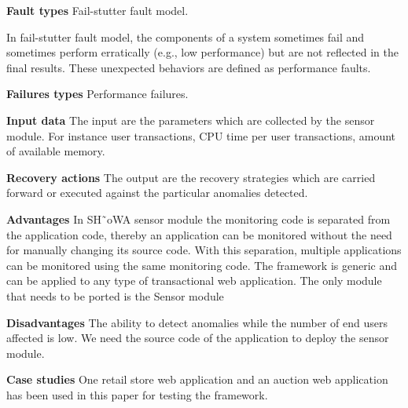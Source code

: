 \begin{compactitem}
\item[\textbf{Fault types}]Fail-stutter fault model. 

In fail-stutter fault model, the components of a system sometimes fail and sometimes perform erratically (e.g., low performance) but are not reflected in the final results. These unexpected behaviors are defined as performance faults.

\item[\textbf{Failures types}]Performance failures.

\item[\textbf{Input data}] The input are the parameters which are collected by the sensor module. For instance user transactions, CPU time per user transactions, amount of available memory.

\item[\textbf{Recovery actions}]The output are the recovery strategies which are carried forward or executed against the particular anomalies detected.

\item[\textbf{Advantages}] In SH˜oWA sensor module the monitoring code is separated from the application code, thereby an application can be monitored without the need for manually changing its source code. With this separation, multiple applications can be monitored using the same monitoring code. The framework is generic and can be applied to any type of transactional web application. The only module that needs to be ported is the Sensor module

\item[\textbf{Disadvantages}]The ability to detect anomalies while the number of end users affected is low.
We need the source code of the application to deploy the sensor module.

\item[\textbf{Case studies}]One retail store web application and an auction web application has been used in this paper for testing the framework.
\end{compactitem}



